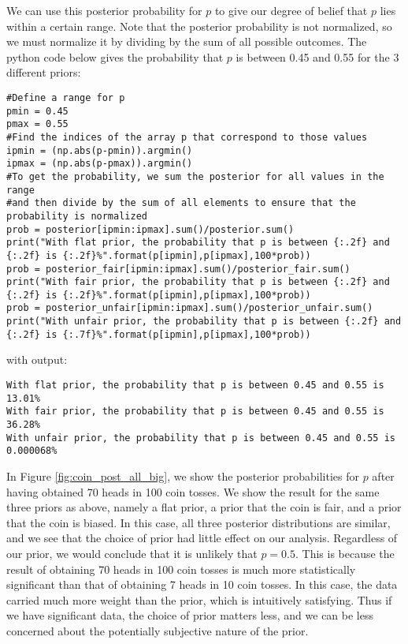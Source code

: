 We can use this posterior probability for $p$ to give our degree of belief that $p$ lies within a certain range. Note that the posterior probability is not normalized, so we must normalize it by dividing by the sum of all possible outcomes. The python code below gives the probability that $p$ is between 0.45 and 0.55 for the 3 different priors:
\begin{lstlisting}[frame=single] 
#Define a range for p
pmin = 0.45
pmax = 0.55
#Find the indices of the array p that correspond to those values
ipmin = (np.abs(p-pmin)).argmin()
ipmax = (np.abs(p-pmax)).argmin()
#To get the probability, we sum the posterior for all values in the range
#and then divide by the sum of all elements to ensure that the probability is normalized
prob = posterior[ipmin:ipmax].sum()/posterior.sum()
print("With flat prior, the probability that p is between {:.2f} and {:.2f} is {:.2f}%".format(p[ipmin],p[ipmax],100*prob))
prob = posterior_fair[ipmin:ipmax].sum()/posterior_fair.sum()
print("With fair prior, the probability that p is between {:.2f} and {:.2f} is {:.2f}%".format(p[ipmin],p[ipmax],100*prob))
prob = posterior_unfair[ipmin:ipmax].sum()/posterior_unfair.sum()
print("With unfair prior, the probability that p is between {:.2f} and {:.2f} is {:.7f}%".format(p[ipmin],p[ipmax],100*prob))
\end{lstlisting}
with output:
\begin{verbatim}
With flat prior, the probability that p is between 0.45 and 0.55 is 13.01%
With fair prior, the probability that p is between 0.45 and 0.55 is 36.28%
With unfair prior, the probability that p is between 0.45 and 0.55 is 0.000068%
\end{verbatim}
 

In Figure \ref{fig:coin_post_all_big}, we show the posterior probabilities for $p$ after having obtained 70 heads in 100 coin tosses. We show the result for the same three priors as above, namely a flat prior, a prior that the coin is fair, and a prior that the coin is biased. In this case, all three posterior distributions are similar, and we see that the choice of prior had little effect on our analysis. Regardless of our prior, we would conclude that it is unlikely that $p=0.5$. This is because the result of obtaining 70 heads in 100 coin tosses is much more statistically significant than that of obtaining 7 heads in 10 coin tosses. In this case, the data carried much more weight than the prior, which is intuitively satisfying. Thus if we have significant data, the choice of prior matters less, and we can be less concerned about the potentially subjective nature of the prior.

